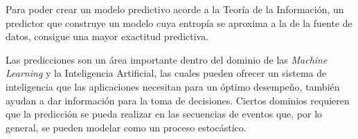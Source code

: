  













Para poder crear un modelo predictivo acorde a la Teoría de la Información, un predictor que construye un modelo cuya entropía se aproxima a la de la fuente de datos, consigue una mayor exactitud predictiva. 


Las predicciones son un área importante dentro del dominio de las \emph{Machine Learning} y la Inteligencia Artificial, las cuales pueden ofrecer un sistema de inteligencia que las aplicaciones necesitan para un óptimo desempeño, también ayudan a dar información para la toma de decisiones. Ciertos dominios requieren que la predicción se pueda realizar en las secuencias de eventos que, por lo general, se pueden modelar como un proceso estocástico. 


